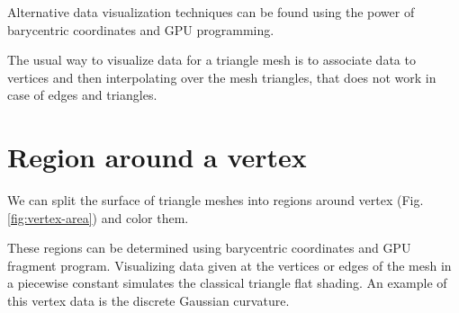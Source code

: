 \label{section:vertex-area-chapter}
Alternative data visualization techniques can be found using the power of barycentric coordinates and GPU programming.

The usual way to visualize data for a triangle mesh is to associate data to vertices and then interpolating over the mesh triangles, that does not work in case of edges and triangles.

\section{Region around a vertex}
We can split the surface of triangle meshes into regions around vertex (Fig. \ref{fig:vertex-area}) and color them.

These regions can be determined using barycentric coordinates and GPU fragment program. Visualizing data given at the vertices or edges of the mesh in a piecewise constant simulates the classical triangle flat shading.
An example of this vertex data is the discrete Gaussian curvature.
